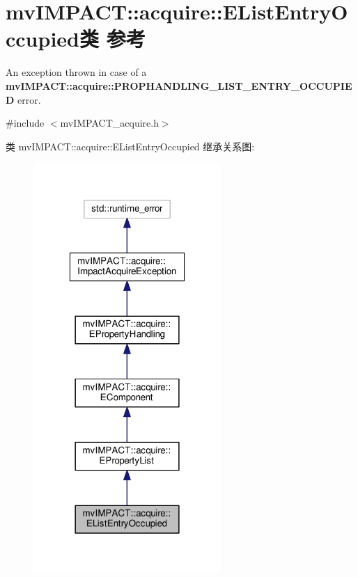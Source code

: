 \hypertarget{classmv_i_m_p_a_c_t_1_1acquire_1_1_e_list_entry_occupied}{\section{mv\+I\+M\+P\+A\+C\+T\+:\+:acquire\+:\+:E\+List\+Entry\+Occupied类 参考}
\label{classmv_i_m_p_a_c_t_1_1acquire_1_1_e_list_entry_occupied}
}


An exception thrown in case of a {\bfseries mv\+I\+M\+P\+A\+C\+T\+::acquire\+::\+P\+R\+O\+P\+H\+A\+N\+D\+L\+I\+N\+G\+\_\+\+L\+I\+S\+T\+\_\+\+E\+N\+T\+R\+Y\+\_\+\+O\+C\+C\+U\+P\+I\+E\+D} error.  




{\ttfamily \#include $<$mv\+I\+M\+P\+A\+C\+T\+\_\+acquire.\+h$>$}



类 mv\+I\+M\+P\+A\+C\+T\+:\+:acquire\+:\+:E\+List\+Entry\+Occupied 继承关系图\+:
\nopagebreak
\begin{figure}[H]
\begin{center}
\leavevmode
\includegraphics[width=202pt]{classmv_i_m_p_a_c_t_1_1acquire_1_1_e_list_entry_occupied__inherit__graph}
\end{center}
\end{figure}


